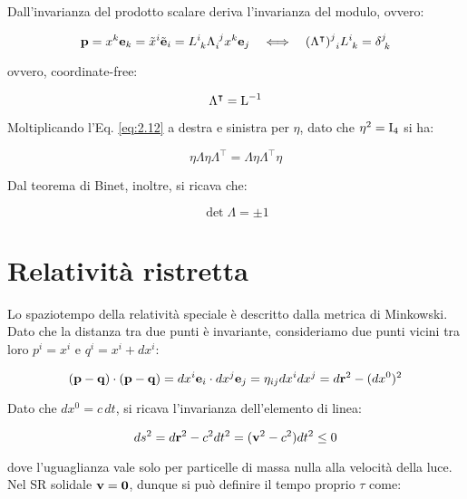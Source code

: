 Dall'invarianza del prodotto scalare deriva l'invarianza del modulo, ovvero:

\begin{equation}
	\mathbf{p} = x^{k} \mathbf{e}_k = \tilde{x}^i \tilde{\mathbf{e}}_i = L^i_{\,\,k} \Lambda^{\,\,j}_i x^k \mathbf{e}_j \quad \Longleftrightarrow \quad (\Lambda^{\intercal})^j_{\,\,\,i} L^i_{\,\,k} = \delta^j_{\,\,k}
	\label{eq:2.13}
\end{equation}

ovvero, coordinate-free:

\begin{equation}
	\Lambda^{\intercal} = \mathbf{\text{L}}^{-1}
	\label{eq:2.14}
\end{equation}

Moltiplicando l'Eq. \ref{eq:2.12} a destra e sinistra per $ \eta $, dato che $ \eta^2 = \mathbf{\text{I}}_4 $ si ha:

\begin{equation}
	\eta \Lambda \eta \Lambda^{\intercal} = \Lambda \eta \Lambda^{\intercal} \eta
	\label{eq:2.15}
\end{equation}

Dal teorema di Binet, inoltre, si ricava che:

\begin{equation}
	\det \Lambda = \pm 1
	\label{eq:2.16}
\end{equation}

\section{Relatività ristretta}

Lo spaziotempo della relatività speciale è descritto dalla metrica di Minkowski.\\
Dato che la distanza tra due punti è invariante, consideriamo due punti vicini tra loro $ p^i = x^i $ e $ q^i = x^i + dx^i $:

\begin{equation}
	(\mathbf{p} - \mathbf{q}) \cdot (\mathbf{p} - \mathbf{q}) = dx^i \mathbf{e}_i \cdot dx^j \mathbf{e}_j = \eta_{ij} dx^i dx^j = d\mathbf{r}^2 - (dx^0)^2
	\label{eq:2.17}
\end{equation}

Dato che $ dx^0 = c\,dt $, si ricava l'invarianza dell'elemento di linea:

\begin{equation}
	ds^2 = d\mathbf{r}^2 - c^2 dt^2 = (\mathbf{v}^2 - c^2) dt^2 \le 0
	\label{eq:2.18}
\end{equation}

dove l'uguaglianza vale solo per particelle di massa nulla alla velocità della luce.\\
Nel SR solidale $ \mathbf{v} = \mathbf{0} $, dunque si può definire il tempo proprio $ \tau $ come:

